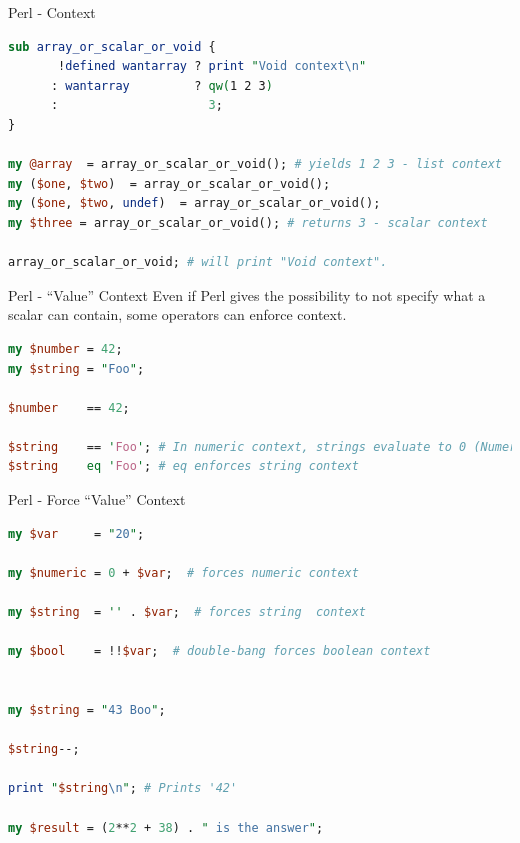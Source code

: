 \documentclass[10pt]{beamer}
\begin{document}
\begin{frame}[fragile]{Perl - Context}
\begin{lstlisting}[language=perl,caption={Full example at examples/01\_intro/1\_context.pl},captionpos=b]
sub array_or_scalar_or_void {
       !defined wantarray ? print "Void context\n"
      : wantarray         ? qw(1 2 3)
      :                     3;
}

my @array  = array_or_scalar_or_void(); # yields 1 2 3 - list context
my ($one, $two)  = array_or_scalar_or_void();
my ($one, $two, undef)  = array_or_scalar_or_void(); 
my $three = array_or_scalar_or_void(); # returns 3 - scalar context

array_or_scalar_or_void; # will print "Void context".
\end{lstlisting}

\end{frame}


\begin{frame}[fragile]{Perl - ``Value'' Context}
Even if Perl gives the possibility to not specify what a scalar can contain, some operators can enforce context.
\begin{lstlisting}[language=perl]
my $number = 42;
my $string = "Foo";

$number    == 42;

$string    == 'Foo'; # In numeric context, strings evaluate to 0 (Numeric Coercion)
$string    eq 'Foo'; # eq enforces string context
\end{lstlisting}


\end{frame}


\begin{frame}[fragile]{Perl - Force ``Value'' Context}

\begin{lstlisting}[language=perl]
my $var     = "20";

my $numeric = 0 + $var;  # forces numeric context

my $string  = '' . $var;  # forces string  context

my $bool    = !!$var;  # double-bang forces boolean context


my $string = "43 Boo";

$string--;

print "$string\n"; # Prints '42'

my $result = (2**2 + 38) . " is the answer";
\end{lstlisting}

\end{frame}
\end{document}
